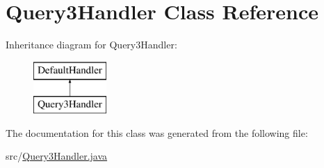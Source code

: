 \hypertarget{class_query3_handler}{}\section{Query3\+Handler Class Reference}
\label{class_query3_handler}
Inheritance diagram for Query3\+Handler\+:\begin{figure}[H]
\begin{center}
\leavevmode
\includegraphics[height=2.000000cm]{class_query3_handler}
\end{center}
\end{figure}


The documentation for this class was generated from the following file\+:\begin{DoxyCompactItemize}
\item 
src/\hyperlink{_query3_handler_8java}{Query3\+Handler.\+java}\end{DoxyCompactItemize}

